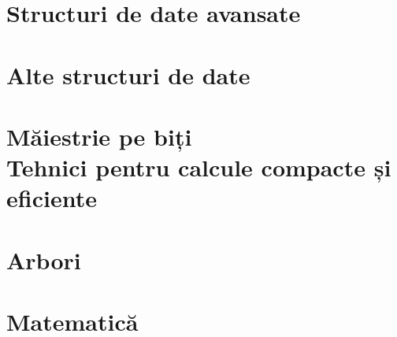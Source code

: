 \documentclass[12pt,openany]{book}
\begin{document}
\part{Structuri de date avansate}







\part{Alte structuri de date}




\part[Măiestrie pe biți]{Măiestrie pe biți\\[\bigskipamount]
  \large Tehnici pentru calcule compacte și eficiente}










\part{Arbori}

















\part{Matematică}











\end{document}

